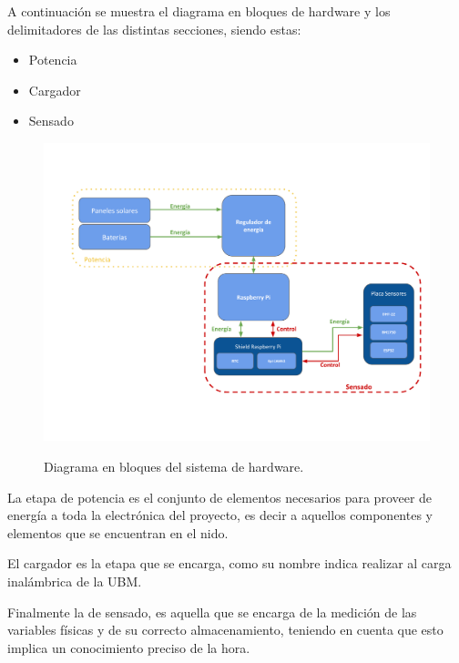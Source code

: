 A continuación se muestra el diagrama en bloques de hardware y los delimitadores de las distintas secciones, siendo estas:
\begin{itemize}
\item Potencia
\item Cargador
\item Sensado
\end{itemize}

\begin{figure}[H]
	\centering
	\includegraphics[width=0.7\linewidth]{ImagenesIngenieria de Detalle/DiagramaHardwareMarcado}
	\label{fig:diagrama_hardware}
	\caption{Diagrama en bloques del sistema de hardware.}
\end{figure}

La etapa de potencia es el conjunto de elementos necesarios para proveer de energía a toda la electrónica del proyecto, es decir a aquellos componentes y elementos que se encuentran en el nido.

El cargador es la etapa que se encarga, como su nombre indica realizar al carga inalámbrica de la UBM.

Finalmente la de sensado, es aquella que se encarga de la medición de las variables físicas y de su correcto almacenamiento, teniendo en cuenta que esto implica un conocimiento preciso de la hora.